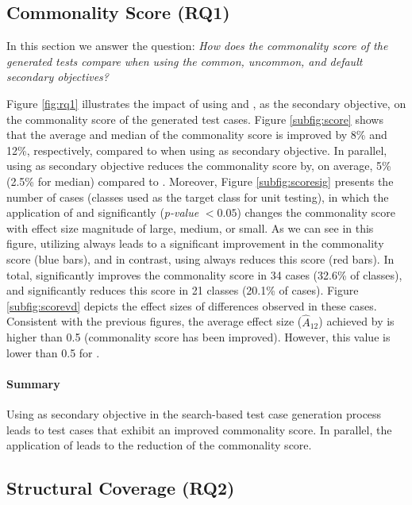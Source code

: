 \subsection{Commonality Score (RQ1)}

In this section we answer the question: \emph{How does the \emph{commonality score} of the generated tests compare when using the \textit{common}, \textit{uncommon}, and \textit{default} secondary objectives?}

Figure \ref{fig:rq1} illustrates the impact of using \com and \ucom, as the secondary objective, on the commonality score of the generated test cases. Figure \ref{subfig:score} shows that the average and median of the commonality score is improved by 8\% and 12\%, respectively, compared to \df when using \com as secondary objective.
In parallel, using \ucom as secondary objective reduces the commonality score by, on average, 5\% (2.5\% for median) compared to \df. Moreover, Figure \ref{subfig:scoresig} presents the number of cases (\ie classes used as the target class for unit testing), in which the application of \com and \ucom significantly (\textit{p-value} $<0.05$) changes the commonality score with effect size magnitude of large, medium, or small. As we can see in this figure, utilizing \com always leads to a significant improvement in the commonality score (blue bars), and in contrast, using \ucom always reduces this score (red bars). In total, \com significantly improves the commonality score in 34 cases (32.6\% of classes), and \ucom significantly reduces this score in 21 classes (20.1\% of cases). Figure \ref{subfig:scorevd} depicts the effect sizes of differences observed in these cases. Consistent with the previous figures, the average effect size ($\widehat{A}_{12}$) achieved by \com is higher than 0.5 (\ie commonality score has been improved). However, this value is lower than 0.5 for \ucom.

\paragraph{Summary} Using \com as secondary objective in the \evosuite search-based test case generation process leads to test cases that exhibit an improved commonality score. In parallel, the application of \ucom leads to the reduction of the commonality score.

\subsection{Structural Coverage (RQ2)}

